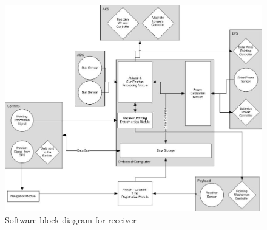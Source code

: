\begin{landscape}
\begin{figure}[ht!]
\centering
\includegraphics[width=1\textheight]{chapters/img/SWBDrec.jpg}
\caption{Software block diagram for receiver}
\label{fig:SWBDrec}
\end{figure}
\end{landscape}